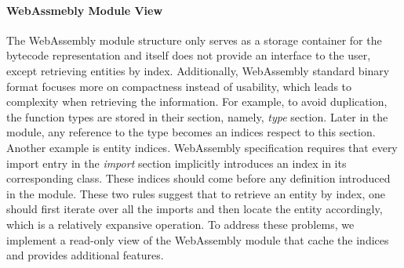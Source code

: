 \paragraph{WebAssmebly Module View} The WebAssembly module structure only serves as a storage container for the bytecode representation and itself does not provide an interface to the user, except retrieving entities by index. Additionally, WebAssembly standard binary format focuses more on compactness instead of usability, which leads to complexity when retrieving the information. For example, to avoid duplication, the function types are stored in their section, namely, \emph{type} section. Later in the module, any reference to the type becomes an indices respect to this section. Another example is entity indices. WebAssembly specification requires that every import entry in the \emph{import} section implicitly introduces an index in its corresponding class. These indices should come before any definition introduced in the module. These two rules suggest that to retrieve an entity by index, one should first iterate over all the imports and then locate the entity accordingly, which is a relatively expansive operation. To address these problems, we implement a read-only view of the WebAssembly module that cache the indices and provides additional features. 

